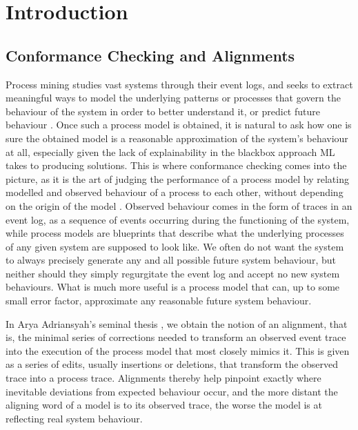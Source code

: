\documentclass[conference]{IEEEtran}
\begin{document}
	\section{Introduction} 
	
	\subsection{Conformance Checking and Alignments} 
	
	Process mining studies vast systems through their event logs, and seeks to extract meaningful ways to model the underlying patterns or processes that govern the behaviour of the system in order to better understand it, or predict future behaviour \cite{A16}.
	Once such a process model is obtained, it is natural to ask how one is sure the obtained model is a reasonable approximation of the system’s behaviour at all, especially given the lack of explainability in the blackbox approach ML takes to producing solutions.
	This is where conformance checking comes into the picture, as it is the art of judging the performance of a process model by relating modelled and observed behaviour of a process to each other, without depending on the origin of the model \cite{CDSW18}.
	Observed behaviour comes in the form of traces in an event log, as a sequence of events occurring during the functioning of the system, while process models are blueprints that describe what the underlying processes of any given system are supposed to look like.
	We often do not want the system to always precisely generate any and all possible future system behaviour, but neither should they simply regurgitate the event log and accept no new system behaviours. 
	What is much more useful is a process model that can, up to some small error factor, approximate any reasonable future system behaviour. 
	
	In Arya Adriansyah's seminal thesis \cite{Adriansyah2014AligningOA}, we obtain the notion of an alignment, that is, the minimal series of corrections needed to transform an observed event trace into the execution of the process model that most closely mimics it.  
	This is given as a series of edits, usually insertions or deletions, that transform the observed trace into a process trace.  
	Alignments thereby help pinpoint exactly where inevitable deviations from expected behaviour occur, and the more distant the aligning word of a model is to its observed trace, the worse the model is at reflecting real system behaviour. 
	
\end{document}
